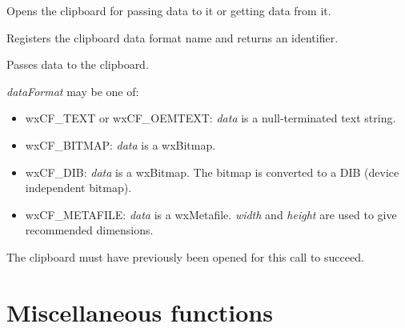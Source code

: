 \label{wxopenclipboard}


Opens the clipboard for passing data to it or getting data from it.


\label{wxregisterclipboardformat}


Registers the clipboard data format name and returns an identifier.


\label{wxsetclipboarddata}


Passes data to the clipboard.

{\it dataFormat} may be one of:

\begin{itemize}\itemsep=0pt
\item wxCF\_TEXT or wxCF\_OEMTEXT: {\it data} is a null-terminated text string.
\item wxCF\_BITMAP: {\it data} is a wxBitmap.
\item wxCF\_DIB: {\it data} is a wxBitmap. The bitmap is converted to a DIB (device independent bitmap).
\item wxCF\_METAFILE: {\it data} is a wxMetafile. {\it width} and {\it height} are used to give recommended dimensions.
\end{itemize}

The clipboard must have previously been opened for this call to succeed.


\section{Miscellaneous functions}\label{miscellany}


\label{wxbase64decode}



